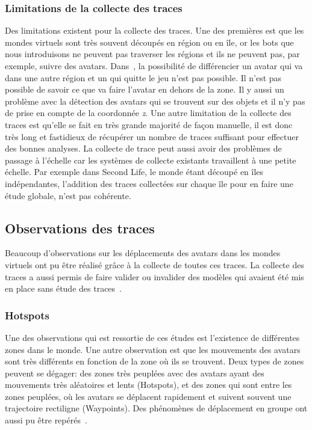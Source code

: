  		\subsubsection{Limitations de la collecte des traces}
	Des limitations existent pour la collecte des traces. Une des premières est que les mondes virtuels sont très souvent découpés en région ou en île, or les bots que nous introduisons ne peuvent pas traverser les régions et ils ne peuvent pas, par exemple, suivre des avatars. Dans~\cite{DBLP:journals/corr/abs-0807-2328}, la possibilité de différencier un avatar qui va dans une autre région et un qui quitte le jeu n'est pas possible. Il n'est pas possible de savoir ce que va faire l'avatar en dehors de la zone. Il y aussi un problème avec la détection des avatars qui se trouvent sur des objets et il n'y pas de prise en compte de la coordonnée \textit{z}. Une autre limitation de la collecte des traces est qu'elle se fait en très grande majorité de façon manuelle, il est donc très long et fastidieux de récupérer un nombre de traces suffisant pour effectuer des bonnes analyses. La collecte de trace peut aussi avoir des problèmes de passage à l'échelle car les systèmes de collecte existants travaillent à une petite échelle. Par exemple dans Second Life, le monde étant découpé en îles indépendantes, l'addition des traces collectées sur chaque île pour en faire une étude globale, n'est pas cohérente.

	\subsection{Observations des traces}
	 Beaucoup d'observations sur les déplacements des avatars dans les mondes virtuels ont pu être réalisé grâce à la collecte de toutes ces traces. La collecte des traces a aussi permis de faire valider ou invalider des modèles qui avaient été mis en place sans étude des traces~\cite{DBLP:journals/corr/abs-0807-2328}. 
		\subsubsection{Hotspots}
	Une des observations qui est ressortie de ces études est l'existence de différentes zones dans le monde. Une autre observation est que les mouvements des avatars sont très différents en fonction de la zone où ils se trouvent. Deux types de zones peuvent se dégager: des zones très peuplées avec des avatars ayant des mouvements très aléatoires et lents (Hotspots), et des zones qui sont entre les zones peuplées, où les avatars se déplacent rapidement et suivent souvent une trajectoire rectiligne (Waypoints). Des phénomènes de déplacement en groupe ont aussi pu être repérés~\cite{15141312}. \\
